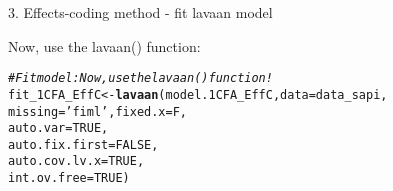 \documentclass[10pt]{beamer}\usepackage[]{graphicx}\usepackage[]{xcolor}
\makeatletter
\newcommand{\hlnum}[1]{\textcolor[rgb]{0.686,0.059,0.569}{#1}}%
\newcommand{\hlsng}[1]{\textcolor[rgb]{0.192,0.494,0.8}{#1}}%
\newcommand{\hlcom}[1]{\textcolor[rgb]{0.678,0.584,0.686}{\textit{#1}}}%
\newcommand{\hldef}[1]{\textcolor[rgb]{0.345,0.345,0.345}{#1}}%
\newcommand{\hlkwb}[1]{\textcolor[rgb]{0.69,0.353,0.396}{#1}}%
\newcommand{\hlkwc}[1]{\textcolor[rgb]{0.333,0.667,0.333}{#1}}%
\newcommand{\hlkwd}[1]{\textcolor[rgb]{0.737,0.353,0.396}{\textbf{#1}}}%
\newenvironment{kframe}{%
 \def\at@end@of@kframe{}%
 \ifinner\ifhmode%
  \def\at@end@of@kframe{\end{minipage}}%
  \begin{minipage}{\columnwidth}%
 \fi\fi%
 \def\FrameCommand##1{\hskip\@totalleftmargin \hskip-\fboxsep
 \colorbox{shadecolor}{##1}\hskip-\fboxsep
     \hskip-\linewidth \hskip-\@totalleftmargin \hskip\columnwidth}%
 \MakeFramed {\advance\hsize-\width
   \@totalleftmargin\z@ \linewidth\hsize
   \@setminipage}}%
 {\par\unskip\endMakeFramed%
 \at@end@of@kframe}
\newenvironment{knitrout}{}{} %
\makeatother
\begin{document}
\begin{frame}[fragile]{3. Effects-coding method - fit lavaan model}

Now, use the lavaan() function:

\vspace{5mm}

\begin{knitrout}
\color{fgcolor}\begin{kframe}
\begin{alltt}
\hlcom{# Fit model: Now, use the lavaan() function!}
\hldef{fit_1CFA_EffC} \hlkwb{<-} \hlkwd{lavaan}\hldef{(model.1CFA_EffC,} \hlkwc{data}\hldef{=data_sapi,}
                      \hlkwc{missing}\hldef{=}\hlsng{'fiml'}\hldef{,} \hlkwc{fixed.x}\hldef{=F,}
                      \hlkwc{auto.var} \hldef{=} \hlnum{TRUE}\hldef{,}
                      \hlkwc{auto.fix.first} \hldef{=} \hlnum{FALSE}\hldef{,}
                      \hlkwc{auto.cov.lv.x} \hldef{=} \hlnum{TRUE}\hldef{,}
                      \hlkwc{int.ov.free} \hldef{=} \hlnum{TRUE}\hldef{)}
\end{alltt}
\end{kframe}
\end{knitrout}

\end{frame}
%
\end{document}
